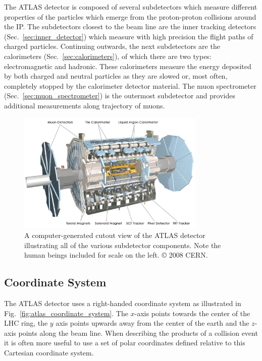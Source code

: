 The ATLAS detector is composed of several subdetectors which measure different properties of the particles which emerge from the proton-proton collisions around the IP.
The subdetectors closest to the beam line are the inner tracking detectors (Sec.~\ref{sec:inner_detector}) which measure with high precision the flight paths of charged particles.
Continuing outwards, the next subdetectors are the calorimeters (Sec.~\ref{sec:calorimeters}), of which there are two types: electromagnetic and hadronic.
These calorimeters measure the energy deposited by both charged and neutral particles as they are slowed or, most often, completely stopped by the calorimeter detector material.
The muon spectrometer (Sec.~\ref{sec:muon_spectrometer}) is the outermost subdetector and provides additional measurements along trajectory of muons.

\begin{figure}
	\centering
	\includegraphics[width=0.8\textwidth]{entire_detector}
	\caption{
	A computer-generated cutout view of the ATLAS detector illustrating all of the various subdetector components.
	Note the human beings included for scale on the left.
	© 2008 CERN.
	}
	\label{fig:atlas_detector_overview}
\end{figure}

\subsection{Coordinate System}
The ATLAS detector uses a right-handed coordinate system as illustrated in Fig.~\ref{fig:atlas_coordinate_system}.
The $x$-axis points towards the center of the LHC ring, the $y$ axis points upwards away from the center of the earth and the $z$-axis points along the beam line.
When describing the products of a collision event it is often more useful to use a set of polar coordinates defined relative to  this Cartesian coordinate system.

